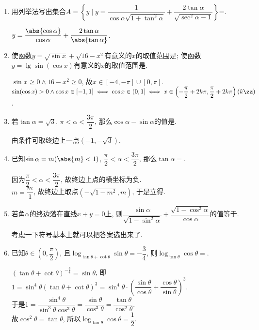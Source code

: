\begin{enumerate}
\item 用列举法写出集合$A=\left\{y\mid y=\dfrac{1}{\cos\alpha\sqrt{1+\tan^2\alpha}}
+\dfrac{2\tan\alpha}{\sqrt{\sec^2\alpha-1}}\right\}$=.
\begin{jieda}
$y=\dfrac{\abs{\cos\alpha}}{\cos\alpha}+\dfrac{2\tan\alpha}{\abs{\tan\alpha}}$. 
\end{jieda}


\item 使函数$y=\sqrt{\sin{x}}+\sqrt{16-x^2}$有意义的$x$的取值范围是\blkda[3]{$[-4,-\pi]\cup[0,\pi]$}; 
使函数$y=\lg\sin(\cos{x})$有意义的$x$的取值范围是. 
\begin{jieda}
$\sin{x}\geq 0\land 16-x^2\geq 0$, 故$x\in[-4,-\pi]\cup[0,\pi]$. \\
$\sin(\cos{x})>0\land\cos{x}\in[-1,1]\iff\cos{x}\in(0,1]\iff x\in\left(-\dfrac{\pi}{2}+2k\pi,\dfrac{\pi}{2}+2k\pi\right)(k\zz)$. 
\end{jieda}


\item 若$\tan\alpha=\sqrt3$, $\pi<\alpha<\dfrac{3\pi}{2}$, 那么$\cos\alpha-\sin\alpha$的值是.
\begin{jieda}
由条件可取终边上一点$(-1,-\sqrt{3})$. 
\end{jieda}


\item 已知$\sin\alpha=m(\abs{m}<1)$, $\dfrac{\pi}{2}<\alpha<\dfrac{3\pi}{2}$, 那么$\tan\alpha=$.
\begin{jieda}
因为$\dfrac{\pi}{2}<\alpha<\dfrac{3\pi}{2}$, 故终边上点的横坐标为负. \\
$m=\dfrac{m}{1}$, 故终边上取点$(-\sqrt{1-m^2},m)$, 于是立得. 
\end{jieda}


\item 若角$\alpha$的终边落在直线$x+y=0$上, 则$\dfrac{\sin\alpha}{\sqrt{1-\sin^2\alpha}}+\dfrac{\sqrt{1-\cos^2\alpha}}{\cos\alpha}$的值等于.
\begin{jieda}
考虑一下符号基本上就可以把答案选出来了. 
\end{jieda}


\item 已知$\theta\in\left(0,\dfrac{\pi}{2}\right)$, 且$\log_{\tan\theta+\cot\theta}\sin\theta=-\dfrac{3}{4}$, 
则$\log_{\tan\theta}\cos\theta=$.
\begin{jieda}
$(\tan\theta+\cot\theta)^{-\frac{3}{4}}=\sin\theta$, 
即$1=\sin^4\theta(\tan\theta+\cot\theta)^3=\sin^4\theta\cdot\left(\dfrac{\sin\theta}{\cos\theta}+\dfrac{\cos\theta}{\sin\theta}\right)^3$. \\
于是$1=\dfrac{\sin^4\theta}{\sin^3\theta\cos^3\theta}=\dfrac{\sin\theta}{\cos^3\theta}=\dfrac{\tan\theta}{\cos^2\theta}$. \\
故$\cos^2\theta=\tan\theta$, 所以$\log_{\tan\theta}\cos\theta=\dfrac{1}{2}$. 
\end{jieda}




\end{enumerate}
